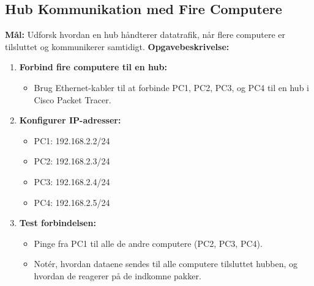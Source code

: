 \subsection{Hub Kommunikation med Fire Computere}
\textbf{Mål:} Udforsk hvordan en hub håndterer datatrafik, når flere computere er tilsluttet og kommunikerer samtidigt.
\newline\newline\noindent
\textbf{Opgavebeskrivelse:}
\begin{enumerate}
	\item \textbf{Forbind fire computere til en hub:}
	\begin{itemize}
		\item Brug Ethernet-kabler til at forbinde PC1, PC2, PC3, og PC4 til en hub i Cisco Packet Tracer.
	\end{itemize}
	\item \textbf{Konfigurer IP-adresser:}
	\begin{itemize}
		\item PC1: 192.168.2.2/24
		\item PC2: 192.168.2.3/24
		\item PC3: 192.168.2.4/24
		\item PC4: 192.168.2.5/24
	\end{itemize}
	\item \textbf{Test forbindelsen:}
	\begin{itemize}
		\item Pinge fra PC1 til alle de andre computere (PC2, PC3, PC4).
		\item Notér, hvordan dataene sendes til alle computere tilsluttet hubben, og hvordan de reagerer på de indkomne pakker.
	\end{itemize}
\end{enumerate}

